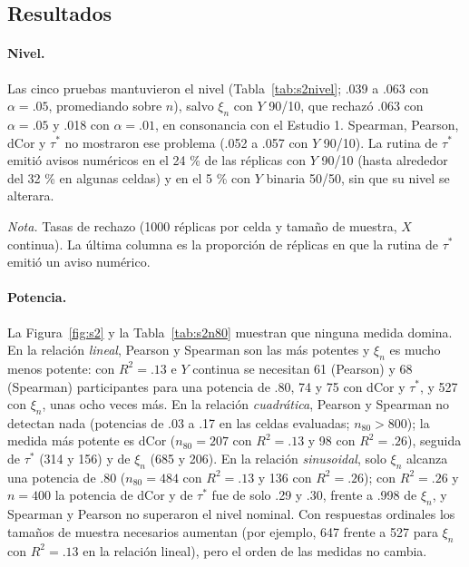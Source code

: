 \documentclass[man,donotrepeattitle,floatsintext]{apa7}
\begin{document}
\subsection{Resultados}

\paragraph{Nivel.} Las cinco pruebas mantuvieron el nivel (Tabla~\ref{tab:s2nivel}; .039 a .063 con $\alpha=.05$, promediando sobre $n$), salvo $\xi_n$ con $Y$ 90/10, que rechazó .063 con $\alpha=.05$ y .018 con $\alpha=.01$, en consonancia con el Estudio 1. Spearman, Pearson, dCor y $\tau^*$ no mostraron ese problema (.052 a .057 con $Y$ 90/10). La rutina de $\tau^*$ emitió avisos numéricos en el 24 \% de las réplicas con $Y$ 90/10 (hasta alrededor del 32 \% en algunas celdas) y en el 5 \% con $Y$ binaria 50/50, sin que su nivel se alterara.

\begin{table}
\caption{Error Tipo I de las cinco pruebas bajo independencia (promedio sobre $n=50$--$400$)}
\label{tab:s2nivel}
\begin{threeparttable}
\small

\begin{tablenotes}[flushleft]
\small
\item \textit{Nota.} Tasas de rechazo (1000 réplicas por celda y tamaño de muestra, $X$ continua). La última columna es la proporción de réplicas en que la rutina de $\tau^*$ emitió un aviso numérico.
\end{tablenotes}
\end{threeparttable}
\end{table}

\paragraph{Potencia.} La Figura~\ref{fig:s2} y la Tabla~\ref{tab:s2n80} muestran que ninguna medida domina. En la relación \emph{lineal}, Pearson y Spearman son las más potentes y $\xi_n$ es mucho menos potente: con $R^2=.13$ e $Y$ continua se necesitan 61 (Pearson) y 68 (Spearman) participantes para una potencia de .80, 74 y 75 con dCor y $\tau^*$, y 527 con $\xi_n$, unas ocho veces más. En la relación \emph{cuadrática}, Pearson y Spearman no detectan nada (potencias de .03 a .17 en las celdas evaluadas; $n_{80}>800$); la medida más potente es dCor ($n_{80}=207$ con $R^2=.13$ y 98 con $R^2=.26$), seguida de $\tau^*$ (314 y 156) y de $\xi_n$ (685 y 206). En la relación \emph{sinusoidal}, solo $\xi_n$ alcanza una potencia de .80 ($n_{80}=484$ con $R^2=.13$ y 136 con $R^2=.26$); con $R^2=.26$ y $n=400$ la potencia de dCor y de $\tau^*$ fue de solo .29 y .30, frente a .998 de $\xi_n$, y Spearman y Pearson no superaron el nivel nominal. Con respuestas ordinales los tamaños de muestra necesarios aumentan (por ejemplo, 647 frente a 527 para $\xi_n$ con $R^2=.13$ en la relación lineal), pero el orden de las medidas no cambia.
\end{document}
